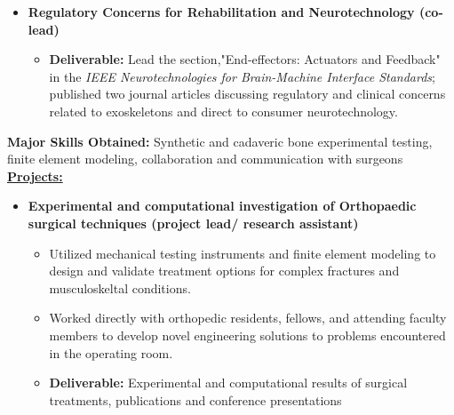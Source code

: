 \begin{adjustwidth}{0.5em}{0pt}
\begin{itemize}
    \item[\color{accent}\ding{224}] {\color{emphasis}\textbf{Regulatory Concerns for Rehabilitation and Neurotechnology (co-lead) \hspace{10pt}}}\\
    \smallskip
        \begin{itemize}
            \item {\color{pink} \textbf{Deliverable:}} Lead the section,"End-effectors: Actuators and Feedback" in the \textit{IEEE Neurotechnologies for Brain-Machine Interface Standards}; published two journal articles discussing regulatory and clinical concerns related to exoskeletons  and direct to consumer neurotechnology.  
        \end{itemize}    
    \end{itemize}
\end{adjustwidth}

\vspace{-0.5em}
\divider

\smallskip
{\small{\color{skills}\textbf{Major Skills Obtained:}} Synthetic and cadaveric bone experimental testing, finite element modeling, collaboration and communication with surgeons}\\
\smallskip
{\color{accent}\underline{\textbf{Projects:}}}\\
\begin{adjustwidth}{0.5em}{0pt}
    \begin{itemize}
    \item[\color{accent}\ding{224}] {\color{emphasis}\textbf{Experimental and computational investigation of Orthopaedic surgical techniques (project lead/ research assistant)}}\\
    \smallskip
        \begin{itemize}
            \item Utilized mechanical testing instruments and finite element modeling to design and validate treatment options for complex fractures and musculoskeltal conditions.
            \item Worked directly with orthopedic residents, fellows, and attending faculty members to develop novel engineering solutions to problems encountered in the operating room. 
            \item {\color{pink} \textbf{Deliverable:}} Experimental and computational results of surgical treatments, publications and conference presentations
        \end{itemize}
    \end{itemize}
\end{adjustwidth}


